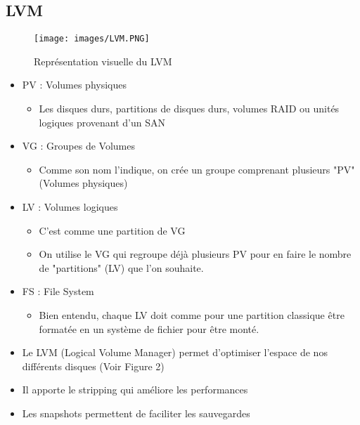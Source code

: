 \documentclass[a4paper]{article}
\begin{document}
      \subsection{LVM}
      \begin{figure}[H]
        \centering
        \texttt{[image: images/LVM.PNG]}
        \caption{Représentation visuelle du LVM}
      \end{figure}
      \begin{itemize}[label = \textbullet, font = \Large]
        \item PV : Volumes physiques
        \begin{itemize}[label=, font=\scriptsize] 
          \item Les disques durs, partitions de disques durs, volumes RAID ou unités logiques provenant d'un SAN
        \end{itemize}
        \item VG : Groupes de Volumes
        \begin{itemize}[label=, font=\scriptsize] 
          \item Comme son nom l'indique, on crée un groupe comprenant plusieurs "PV" (Volumes physiques)
        \end{itemize}
        \item LV : Volumes logiques
        \begin{itemize}[label=, font=\scriptsize] 
          \item C'est comme une partition de VG
          \item On utilise le VG qui regroupe déjà plusieurs PV pour en faire le nombre de "partitions" (LV) que l'on souhaite. 
        \end{itemize}
        \item FS : File System
        \begin{itemize}[label=, font=\scriptsize] 
          \item Bien entendu, chaque LV doit comme pour une partition classique être formatée en un système de fichier pour être monté.
        \end{itemize}
      \end{itemize}

      \begin{itemize}[label = \textbullet, font = \Large]
        \item Le LVM (Logical Volume Manager) permet d'optimiser l'espace de nos différents disques (Voir Figure 2)
        \item Il apporte le stripping qui améliore les performances
        \item Les snapshots permettent de faciliter les sauvegardes
      \end{itemize}
      
\end{document}
